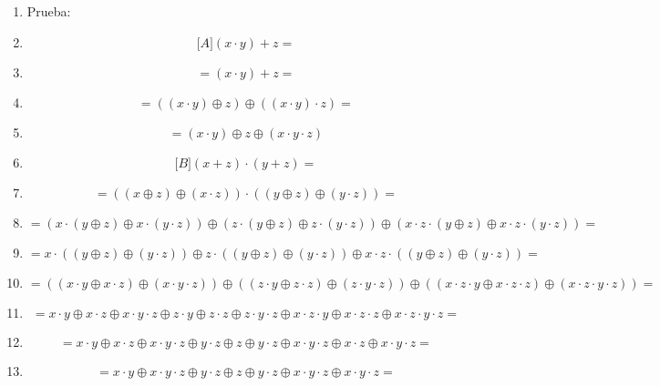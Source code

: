 \begin{enumerate}
\begin{enumerate}
\begin{enumerate}
\begin{enumerate}
        \begin{enumerate}
        \def\labelenumv{\arabic{enumv}.}
        \tightlist
        \item
          Prueba:
        \item
          \[{\lbrack A\rbrack}{}{}{}{{{({x \cdot y})} + z} =}\]
        \item
          \[{= {{({x \cdot y})} + z}} = {}\]
        \item
          \[{= {({{({x \cdot y})} \oplus z})}} \oplus {{({{({x \cdot y})} \cdot z})} =}\]
        \item
          \[{= {({x \cdot y})}} \oplus z \oplus {({{x \cdot y} \cdot z})}\]
        \item
          \[{\lbrack B\rbrack}{}{}{}{{{({x + z})} \cdot {({y + z})}} =}\]
        \item
          \[{= {{({{({x \oplus z})} \oplus {({x \cdot z})}})} \cdot {({{({y \oplus z})} \oplus {({y \cdot z})}})}}} = {}\]
        \item
          \[{= {({{x \cdot {({y \oplus z})}} \oplus {x \cdot {({y \cdot z})}}})}} \oplus {({{z \cdot {({y \oplus z})}} \oplus {z \cdot {({y \cdot z})}}})} \oplus {{({{{x \cdot z} \cdot {({y \oplus z})}} \oplus {{x \cdot z} \cdot {({y \cdot z})}}})} =}\]
        \item
          \[{= {x \cdot {({{({y \oplus z})} \oplus {({y \cdot z})}})}}} \oplus {z \cdot {({{({y \oplus z})} \oplus {({y \cdot z})}})}} \oplus {{{x \cdot z} \cdot {({{({y \oplus z})} \oplus {({y \cdot z})}})}} =}\]
        \item
          \[{= {({{({{x \cdot y} \oplus {x \cdot z}})} \oplus {({{x \cdot y} \cdot z})}})}} \oplus {({{({{z \cdot y} \oplus {z \cdot z}})} \oplus {({{z \cdot y} \cdot z})}})} \oplus {{({{({{{x \cdot z} \cdot y} \oplus {{x \cdot z} \cdot z}})} \oplus {({{{x \cdot z} \cdot y} \cdot z})}})} =}\]
        \item
          \[{= {x \cdot y}} \oplus {x \cdot z} \oplus {{x \cdot y} \cdot z} \oplus {z \cdot y} \oplus {z \cdot z} \oplus {{z \cdot y} \cdot z} \oplus {{x \cdot z} \cdot y} \oplus {{x \cdot z} \cdot z} \oplus {{{{x \cdot z} \cdot y} \cdot z} =}\]
        \item
          \[{= {x \cdot y}} \oplus {x \cdot z} \oplus {{x \cdot y} \cdot z} \oplus {y \cdot z} \oplus z \oplus {y \cdot z} \oplus {{x \cdot y} \cdot z} \oplus {x \cdot z} \oplus {{{x \cdot y} \cdot z} =}\]
        \item
          \[{= {x \cdot y}} \oplus {{x \cdot y} \cdot z} \oplus {y \cdot z} \oplus z \oplus {y \cdot z} \oplus {{x \cdot y} \cdot z} \oplus {{{x \cdot y} \cdot z} =}\]

\end{enumerate}
\end{enumerate}
\end{enumerate}
\end{enumerate}
\end{enumerate}
